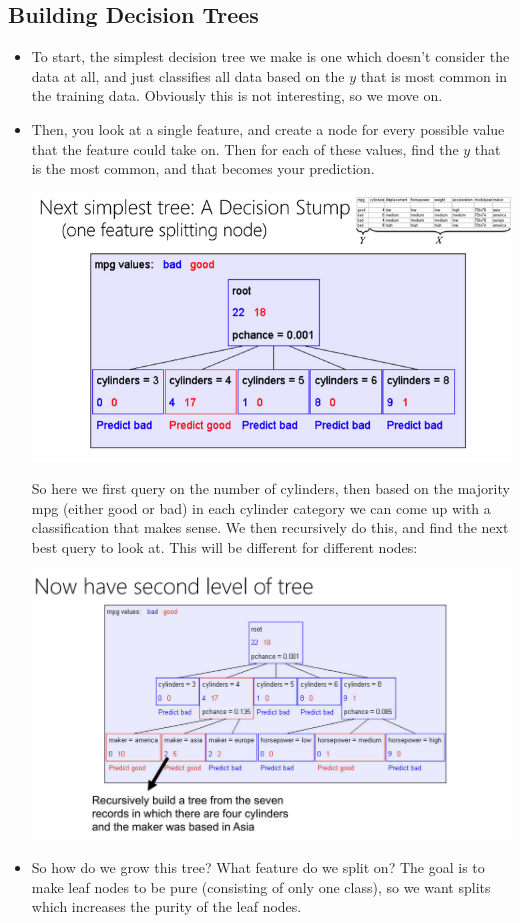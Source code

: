 \subsection{Building Decision Trees}
\begin{itemize}
	\item To start, the simplest decision tree we make is one which doesn't consider the data at all, and
		just classifies all data based on the \( y \) that is most common in the training data. Obviously
		this is not interesting, so we move on. 
	\item Then, you look at a single feature, and create a node for every possible value that the feature
		could take on. Then for each of these values, find the \( y \) that is the most common, and that
		becomes your prediction.
		\begin{center}
			\includegraphics[scale=0.5]{images/lec17-1.png}
		\end{center}
		So here we first query on the number of cylinders, then based on the majority mpg (either good or
		bad) in each cylinder category we can come up with a classification that makes sense. We then
		recursively do this, and find the next best query to look at. This will be different for different
		nodes:  
		\begin{center}
			\includegraphics[scale=0.5]{images/lec17-2.png}
		\end{center}
	\item So how do we grow this tree? What feature do we split on? The goal is to make leaf nodes to be
		pure (consisting of only one class), so we want splits which increases the purity of the leaf nodes.  


\end{itemize}
